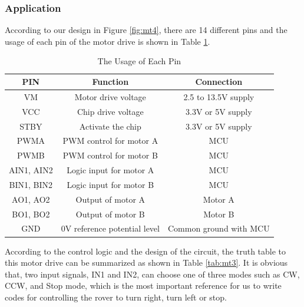 \documentclass[12pt, a4paper, oneside]{report}
\begin{document}
\subsubsection{Application}

According to our design in Figure \ref{fig:mt4}, there are 14 different pins and the usage of each pin of the motor drive is shown in Table \ref{tab:mt2}.

\begin{table}[H]
    \centering
    \begin{tabular}{|c|c|c|}
    \hline
        PIN & Function & Connection \\ \hline
        VM & Motor drive voltage & 2.5 to 13.5V supply \\ \hline
        VCC & Chip drive voltage & 3.3V or 5V supply \\ \hline
        STBY & Activate the chip & 3.3V or 5V supply \\ \hline
        PWMA & PWM control for motor A & MCU \\ \hline
        PWMB & PWM control for motor B & MCU \\ \hline
        AIN1, AIN2 & Logic input for motor A & MCU \\ \hline
        BIN1, BIN2 & Logic input for motor B & MCU \\ \hline
        AO1, AO2 & Output of motor A & Motor A \\ \hline
        BO1, BO2 & Output of motor B & Motor B \\ \hline
        GND & 0V reference potential level & Common ground with MCU \\ \hline
    \end{tabular}
    \caption{The Usage of Each Pin}
    \label{tab:mt2}
\end{table}
\newpage
According to the control logic and the design of the circuit, the truth table to this motor drive can be summarized as shown in Table \ref{tab:mt3}. It is obvious that, two input signals, IN1 and IN2, can choose one of three modes such as CW, CCW, and Stop mode, which is the most important reference for us to write codes for controlling the rover to turn right, turn left or stop.
\end{document}
